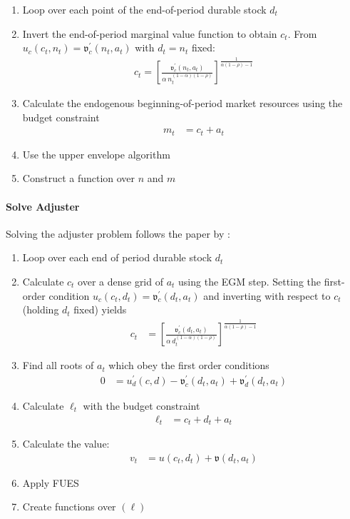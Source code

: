 \begin{enumerate}
	\item Loop over each point of the end-of-period durable stock $d_t$
	\item Invert the end-of-period marginal value function to obtain $c_t$. From $u_c(c_t,n_t)=\mathfrak{v}^{'}_c(n_t,a_t)$ with $d_t=n_t$ fixed:\\
	\begin{align*}
		c_t = \left[\frac{\mathfrak{v}^{'}_c(n_t,a_t)}{\alpha\,n_t^{(1-\alpha)(1-\rho)}}\right]^{\frac{1}{\alpha(1-\rho)-1}}
	\end{align*}
	\item Calculate the endogenous beginning-of-period market resources using the budget constraint
	\begin{align*}
		m_t &= c_t + a_t
	\end{align*}
	\item Use the upper envelope algorithm
	\item Construct a function over $n$ and $m$
\end{enumerate}



\paragraph{Solve Adjuster}
Solving the adjuster problem follows the paper by \cite{Dobrescu2022-ii}:
\begin{enumerate}
	\item Loop over each end of period durable stock $d_t$
	\item Calculate $c_t$ over a dense grid of $a_t$ using the EGM step. Setting the first-order condition $u_c(c_t,d_t)=\mathfrak{v}^{'}_c(d_t,a_t)$ and inverting with respect to $c_t$ (holding $d_t$ fixed) yields\\
	\begin{align}
		c_t &= \left[\frac{\mathfrak{v}^{'}_c(d_t,a_t)}{\alpha\,d_t^{(1-\alpha)(1-\rho)}}\right]^{\frac{1}{\alpha(1-\rho)-1}}
	\end{align}
	\item Find all roots of $a_t$ which obey the first order conditions
	\begin{align}
		0 &= u^{'}_d(c, d) - \mathfrak{v}^{'}_c(d_t, a_t) + \mathfrak{v}^{'}_d(d_t, a_t)
	\end{align}
	\item Calculate $\ell_t$ with the budget constraint
	\begin{align}
		\ell_t &= c_t + d_t + a_t
	\end{align}
	\item Calculate the value:
	\begin{align}
		v_t &= u(c_t, d_t) + \mathfrak{v}(d_t, a_t)
	\end{align}
	\item Apply FUES
	\item Create functions over $(\ell)$
\end{enumerate}


